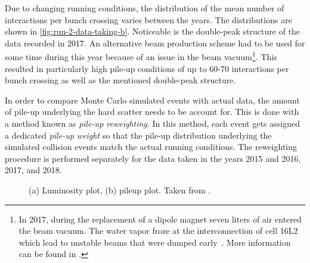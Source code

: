 Due to changing running conditions, the distribution of the mean number of interactions per bunch crossing varies between the years.
The distributions are shown in \cref{fig:run-2-data-taking-b}.
Noticeable is the double-peak structure of the data recorded in 2017.
An alternative beam production scheme had to be used for some time during this year because of an issue in the beam vacuum\footnote{In 2017, during the replacement of a dipole magnet seven liters of air entered the beam vacuum. The water vapor froze at the interconnection of cell 16L2 which lead to unstable beams that were dumped early~\cite{Jimenez:2646067,Salvant:2646056}. More information can be found in .}. This resulted in particularly high pile-up conditions of up to 60-70 interactions per bunch crossing as well as the mentioned double-peak structure.

In order to compare Monte Carlo simulated events with actual data, the amount of pile-up underlying the hard scatter needs to be account for. This is done with a method known as \emph{pile-up reweighting}. In this method, each event gets assigned a dedicated \emph{pile-up weight} so that the pile-up distribution underlying the simulated collision events match the actual running conditions. The reweighting procedure is performed separately for the data taken in the years 2015 and 2016, 2017, and 2018.



\begin{figure}
    \caption{(a) Luminosity plot, (b) pileup plot. Taken from .}
    \label{fig:run-2-data-taking}
\end{figure}

